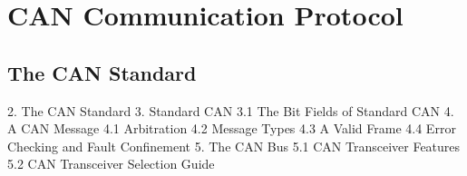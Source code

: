 
\section{CAN Communication Protocol}

\subsection{The CAN Standard }

2. The CAN Standard 
3. Standard CAN 
3.1 The Bit Fields of Standard CAN
4. A CAN Message 
4.1 Arbitration 
4.2 Message Types 
4.3 A Valid Frame 
4.4 Error Checking and Fault Confinement
5. The CAN Bus
5.1 CAN Transceiver Features
5.2 CAN Transceiver Selection Guide 